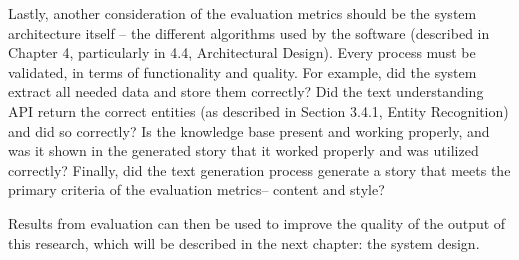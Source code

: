 Lastly, another consideration of the evaluation metrics should be the system architecture itself -- the different algorithms used by the software (described in Chapter 4, particularly in 4.4, Architectural Design). Every process must be validated, in terms of functionality and quality. For example, did the system extract all needed data and store them correctly? Did the text understanding API return the correct entities (as described in Section 3.4.1, Entity Recognition) and did so correctly? Is the knowledge base present and working properly, and was it shown in the generated story that it worked properly and was utilized correctly? Finally, did the text generation process generate a story that meets the primary criteria of the evaluation metrics-- content and style?

Results from evaluation can then be used to improve the quality of the output of this research, which will be described in the next chapter: the system design.